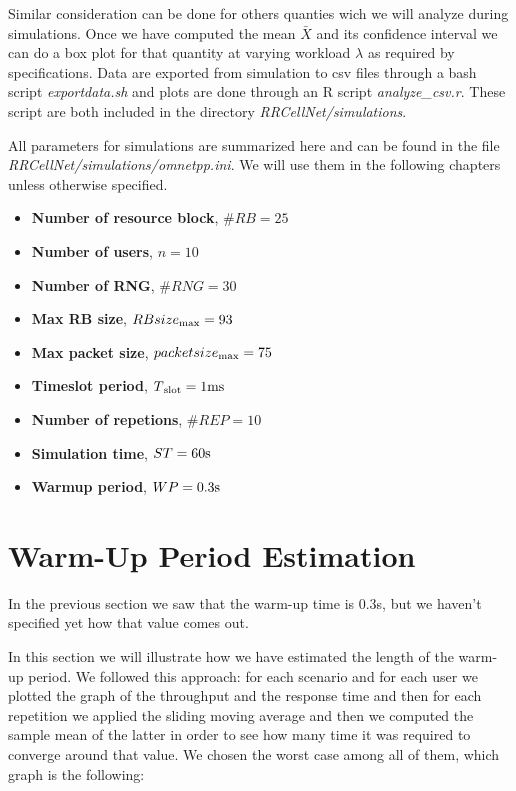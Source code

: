 Similar consideration can be done for others quanties wich we will analyze during simulations. Once we have computed the mean \(\bar{X}\) and its confidence interval we can do a box plot for that quantity at varying workload \(\lambda\) as required by specifications. Data are exported from simulation to csv files through a bash script \textit{exportdata.sh} and plots are done through an R script \textit{analyze\_csv.r}. These script are both included in the directory \textit{RRCellNet/simulations}.

All parameters for simulations are summarized here and can be found in the file \textit{RRCellNet/simulations/omnetpp.ini}. We will use them in the following chapters unless otherwise specified.
\begin{itemize}
\item \textbf{Number of resource block}, \(\#RB = 25\)
\item \textbf{Number of users}, \(n = 10\)
\item \textbf{Number of RNG}, \(\#RNG = 30\)
\item \textbf{Max RB size}, \(RBsize\textsubscript{max} = 93\)
\item \textbf{Max packet size}, \(packetsize\textsubscript{max} = 75\)
\item \textbf{Timeslot period}, \(T\textsubscript{slot} = 1\textnormal{ms}\)
\item \textbf{Number of repetions}, \(\#REP = 10\)
\item \textbf{Simulation time}, \(ST = 60 \textnormal{s}\)
\item \textbf{Warmup period}, \(WP = 0.3 \textnormal{s}\)
\end{itemize}

\section{Warm-Up Period Estimation}
In the previous section we saw that the warm-up time is 0.3s, but we haven't specified yet how that value comes out.

In this section we will illustrate how we have estimated the length of the warm-up period. We followed this approach: for each scenario and for each user we plotted the graph of the throughput and the response time and then for each repetition we applied the sliding moving average and then we computed the sample mean of the latter in order to see how many time it was required to converge around that value.
We chosen the worst case among all of them, which graph is the following:

